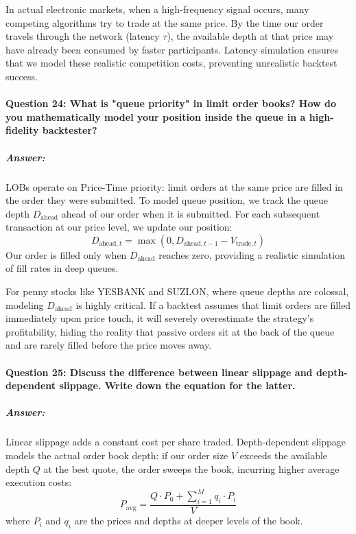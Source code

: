 \documentclass[11pt,a4paper]{article}
\begin{document}
In actual electronic markets, when a high-frequency signal occurs, many competing algorithms try to trade at the same price. By the time our order travels through the network (latency $\tau$), the available depth at that price may have already been consumed by faster participants. Latency simulation ensures that we model these realistic competition costs, preventing unrealistic backtest success.

\paragraph{Question 24: What is "queue priority" in limit order books? How do you mathematically model your position inside the queue in a high-fidelity backtester?}
\subparagraph{Answer:}
LOBs operate on Price-Time priority: limit orders at the same price are filled in the order they were submitted.
To model queue position, we track the queue depth $D_{\text{ahead}}$ ahead of our order when it is submitted. For each subsequent transaction at our price level, we update our position:
\begin{equation}
    D_{\text{ahead}, t} = \max\left(0, D_{\text{ahead}, t-1} - V_{\text{trade}, t}\right)
\end{equation}
Our order is filled only when $D_{\text{ahead}}$ reaches zero, providing a realistic simulation of fill rates in deep queues.

For penny stocks like YESBANK and SUZLON, where queue depths are colossal, modeling $D_{\text{ahead}}$ is highly critical. If a backtest assumes that limit orders are filled immediately upon price touch, it will severely overestimate the strategy's profitability, hiding the reality that passive orders sit at the back of the queue and are rarely filled before the price moves away.

\paragraph{Question 25: Discuss the difference between linear slippage and depth-dependent slippage. Write down the equation for the latter.}
\subparagraph{Answer:}
Linear slippage adds a constant cost per share traded. Depth-dependent slippage models the actual order book depth: if our order size $V$ exceeds the available depth $Q$ at the best quote, the order sweeps the book, incurring higher average execution costs:
\begin{equation}
    P_{\text{avg}} = \frac{Q \cdot P_0 + \sum_{i=1}^M q_i \cdot P_i}{V}
\end{equation}
where $P_i$ and $q_i$ are the prices and depths at deeper levels of the book.
\end{document}
